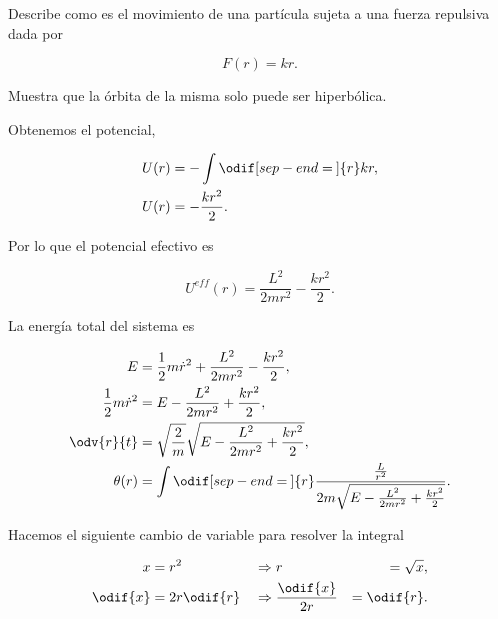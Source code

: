 \documentclass[../main.tex]{subfiles}
\begin{document}
\begin{problema}
	Describe como es el movimiento de una partícula sujeta a
	una fuerza repulsiva dada por

	\begin{equation}
		F(r) = kr.
	\end{equation}

	Muestra que la órbita de la misma solo puede ser hiperbólica.
\end{problema}

\startsolution

Obtenemos el potencial,

\begin{align}
	U(r) & = - \int \odif[sep-end=\medspace]{r} kr ,\nonumber \\
	U(r) & = -\dfrac{kr^{2}}{2}.\label{eq:Potential-P2}
\end{align}

Por lo que el potencial efectivo es

\begin{equation}
	U^{eff}(r) = \dfrac{L^{2}}{2mr^{2}} - \dfrac{kr^{2}}{2}.
	\label{eq:EffectivePotential-P2}
\end{equation}

La energía total del sistema es

\begin{align*}
	E                        & = \dfrac{1}{2}m\dot{r}^{2} + \dfrac{L^{2}}{2mr^{2}} - \dfrac{kr^{2}}{2},\nonumber                                     \\
	\dfrac{1}{2}m\dot{r}^{2} & = E - \dfrac{L^{2}}{2mr^{2}} + \dfrac{kr^{2}}{2},\nonumber                                                            \\
	\odv{r}{t}               & = \sqrt{\dfrac{2}{m}}\sqrt{E - \dfrac{L^{2}}{2mr^{2}} + \dfrac{kr^{2}}{2}},                                           \\
	\theta(r)                & = \int \odif[sep-end=\medspace]{r} \dfrac{\tfrac{L}{r^{2}}}{2m\sqrt{E - \tfrac{L^{2}}{2mr^{2}} + \tfrac{kr^{2}}{2}}}.
\end{align*}

Hacemos el siguiente cambio de variable para resolver la integral

\begin{alignat*}{3}
	x        & = r^{2}       & {}\Rightarrow{} & r                    & = \sqrt{x}, \\
	\odif{x} & = 2r \odif{r} & {}\Rightarrow{} & \dfrac{\odif{x}}{2r} & = \odif{r}.
\end{alignat*}
\end{document}
